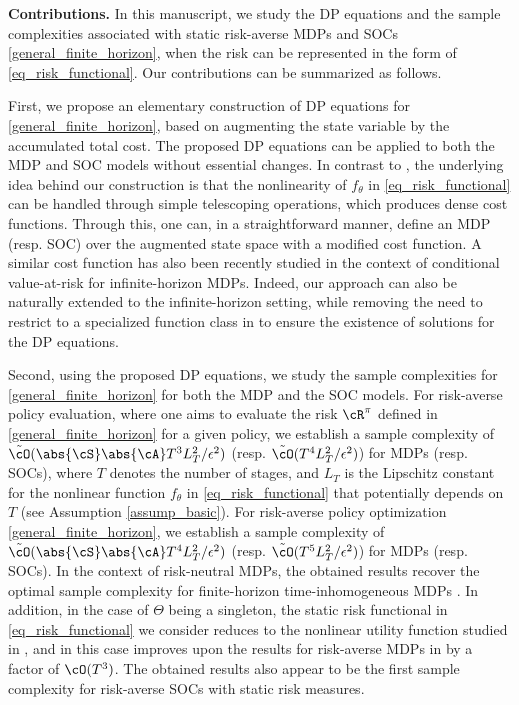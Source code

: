 \documentclass[9pt]{article}
\numberwithin{equation}{section}
\begin{document}
 \vspace{0.05in}

{\bf Contributions.}
In this manuscript, we study the DP equations and the sample complexities associated with static risk-averse MDPs and SOCs \eqref{general_finite_horizon}, when the risk can be represented in the form of \eqref{eq_risk_functional}.
Our contributions can be summarized as follows.

First, we propose an elementary construction of DP equations for \eqref{general_finite_horizon}, based on augmenting the state variable by the accumulated total cost. The proposed DP equations can be applied to both the MDP and SOC models without essential changes.
In contrast to \cite{bauerle2011markov}, the underlying idea behind our construction is that the nonlinearity of $f_\theta$ in \eqref{eq_risk_functional} can be handled through simple telescoping operations, which produces dense cost functions.
Through this, one can, in a straightforward manner, define an MDP (resp. SOC) over the augmented state space with a modified cost function. 
 A similar cost function has also been recently studied in the context of conditional value-at-risk \cite{muni2026reward} for infinite-horizon MDPs.
 Indeed, our approach can also be naturally extended to the infinite-horizon setting, while removing the need to restrict to a specialized function class in \cite{bauerle2014more} to ensure the existence of solutions for the DP equations. 


Second, using the proposed DP equations, we study  the sample complexities for \eqref{general_finite_horizon} for both the MDP and  the SOC models. 
For risk-averse policy evaluation, where one aims to evaluate the risk $\cR^\pi$ defined in \eqref{general_finite_horizon} for a given policy, we establish a sample complexity of 
 $\tilde{\cO}(\abs{\cS}\abs{\cA} T^3 L_T^2/\epsilon^2)$ (resp. $\tilde{\cO}(T^4 L_T^2/\epsilon^2)$) for MDPs (resp. SOCs),
 where $T$ denotes the number of stages, and $L_T$ is the Lipschitz constant for the nonlinear function $f_\theta$ in \eqref{eq_risk_functional} that potentially  depends on $T$ (see Assumption \ref{assump_basic}).
 For risk-averse policy optimization \eqref{general_finite_horizon}, we establish a sample complexity of 
 $\tilde{\cO}(\abs{\cS}\abs{\cA} T^4 L_T^2/\epsilon^2)$ (resp. $\tilde{\cO}(T^5 L_T^2/\epsilon^2)$) for MDPs (resp. SOCs).
 In the context of risk-neutral MDPs, the obtained results recover the optimal sample complexity for finite-horizon time-inhomogeneous MDPs \cite{li2020breaking}.
 In addition, in the case of $\Theta$ being a singleton, the static risk functional in \eqref{eq_risk_functional} we consider reduces to the nonlinear utility function studied in \cite{bauerle2014more,wu2023risk}, and in this case improves upon the results for risk-averse MDPs in \cite{wu2023risk} by a factor of $\cO(T^3)$.
 The obtained results also appear to be the first sample complexity for risk-averse SOCs with static risk measures.  
 
\end{document}
